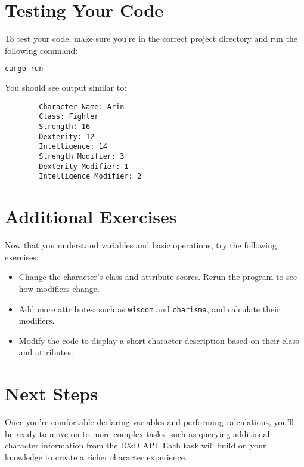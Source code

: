 \documentclass{article}
\begin{document}
	\section*{Testing Your Code}
	To test your code, make sure you’re in the correct project directory and run the following command:
	\begin{lstlisting}[language=bash]
		cargo run
	\end{lstlisting}
	You should see output similar to:
	\begin{verbatim}
		Character Name: Arin
		Class: Fighter
		Strength: 16
		Dexterity: 12
		Intelligence: 14
		Strength Modifier: 3
		Dexterity Modifier: 1
		Intelligence Modifier: 2
	\end{verbatim}
	
	\section*{Additional Exercises}
	Now that you understand variables and basic operations, try the following exercises:
	\begin{itemize}
		\item Change the character’s class and attribute scores. Rerun the program to see how modifiers change.
		\item Add more attributes, such as \texttt{wisdom} and \texttt{charisma}, and calculate their modifiers.
		\item Modify the code to display a short character description based on their class and attributes.
	\end{itemize}
	
	\section*{Next Steps}
	Once you’re comfortable declaring variables and performing calculations, you’ll be ready to move on to more complex tasks, such as querying additional character information from the D\&D API. Each task will build on your knowledge to create a richer character experience.
	
\end{document}
